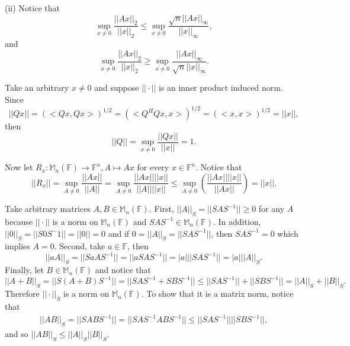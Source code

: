 \documentclass[letterpaper,12pt]{article}
\theoremstyle{definition}
\newenvironment{problem}[2][Problem]{\begin{trivlist}
\item[\hskip \labelsep {\bfseries #1}\hskip \labelsep {\bfseries #2.}]}{\end{trivlist}}
\begin{document}
\begin{problem}{28}
(ii)
Notice that
\begin{equation*}
    \sup_{x\neq 0}\frac{||Ax||_2}{||x||_2}\leq
    \sup_{x\neq 0}\frac{\sqrt{n}||Ax||_\infty}{||x||_\infty},
\end{equation*}
and
\begin{equation*}
    \sup_{x\neq 0}\frac{||Ax||_2}{||x||_2}\geq
    \sup_{x\neq 0}\frac{||Ax||_\infty}{\sqrt{n}||x||_\infty}.
\end{equation*}

\end{problem} \begin{problem}{29}
Take an arbitrary $x\neq 0$ and suppose $||\cdot||$ is an inner product induced norm.
Since
\begin{equation*}
    ||Qx||=\left(<Qx,Qx>\right)^{1/2}=
    \left(<Q^HQx,x>\right)^{1/2}=
    \left(<x,x>\right)^{1/2}=
    ||x||,
\end{equation*}
then
\begin{equation*}
    ||Q||=\sup_{x\neq 0}\frac{||Qx||}{||x||}=1.
\end{equation*}

Now let $R_x:\mathbb M_n(\mathbb F)\to\mathbb F^n, A\mapsto Ax$ for every $x\in\mathbb F^n$.
Notice that
\begin{equation*}
    ||R_x||=\sup_{A\neq 0}\frac{||Ax||}{||A||}=
    \sup_{A\neq 0}\frac{||Ax||||x||}{||A||||x||}\leq
    \sup_{A\neq 0}\left(\frac{||Ax||||x||}{||Ax||}\right)=
    ||x||.
\end{equation*}


\end{problem} \begin{problem}{30}
Take arbitrary matrices $A,B\in\mathbb M_n(\mathbb F)$.
First, $||A||_S=||SAS^{-1}||\geq 0$ for any $A$ because
$||\cdot||$ is a norm on $\mathbb M_n(\mathbb F)$ and
$SAS^{-1}\in\mathbb M_n(\mathbb F)$.
In addition, $||0||_S=||S0S^-1||=||0||=0$ and if
$0=||A||_S=||SAS^{-1}||$, then $SAS^{-1}=0$ which implies $A=0$.
Second, take $a\in\mathbb F$, then
\begin{equation*}
    ||aA||_S=||SaAS^{-1}||=
    ||aSAS^{-1}||=|a|||SAS^{-1}||=
    |a|||A||_S.
\end{equation*}
Finally, let $B\in\mathbb M_n(\mathbb F)$ and notice that
\begin{equation*}
    ||A+B||_S=||S(A+B)S^{-1}||=
    ||SAS^{-1}+SBS^{-1}||\leq||SAS^{-1}||+||SBS^{-1}||=
    ||A||_S+||B||_S.
\end{equation*}
Therefore $||\cdot||_S$ is a norm on $\mathbb M_n(\mathbb F)$.
To show that it is a matrix norm, notice that
\begin{align*}
    ||AB||_S=||SABS^{-1}||=
    ||SAS^{-1}ABS^{-1}||\leq
    ||SAS^{-1}||||SBS^{-1}||,
\end{align*}
and so $||AB||_S\leq||A||_S||B||_S$.


\end{problem}
\end{document}
